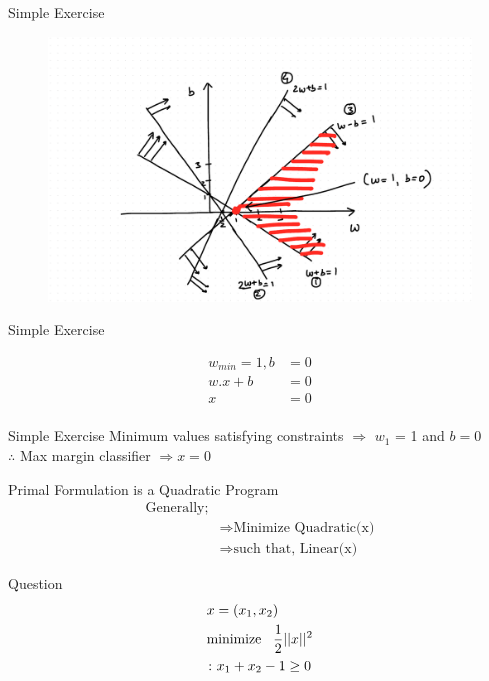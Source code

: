 \documentclass{beamer}
\begin{document}
\begin{frame}{Simple Exercise} 
\begin{figure}
\includegraphics[scale=0.5]{SVM/Svm-27.pdf}
\end{figure}
\end{frame}

\begin{frame}{Simple Exercise}

\begin{align*}
w_{min} = 1, b&= 0\\
w.x + b &= 0\\
x &=0 \\
\end{align*}

\end{frame}

\begin{frame}{Simple Exercise}
Minimum values satisfying constraints  $\Rightarrow$
$w_{1}$ = 1 and $b = 0$\\
$\therefore$ Max margin classifier $ \Rightarrow x = 0$

\end{frame}

\begin{frame}{Primal Formulation is a Quadratic Program}
\begin{align*}
\text{Generally;}&\\
&\Rightarrow \text{Minimize Quadratic(x)}\\
&\Rightarrow \text{such that, Linear(x)}
\end{align*}
\begin{tcolorbox}
Question
\begin{align*}
&{x} = (x_{1}, x_{2})\\
&\text{minimize} \hspace{3mm} \frac{1}{2}||x||^{2}\\
&\colon x_{1} + x_{2} - 1 \geq 0
\end{align*}
\end{tcolorbox}
\end{frame}
\end{document}
